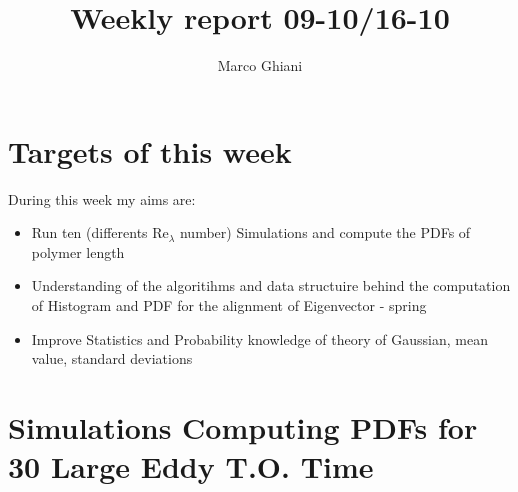 \documentclass[]{article}
\title{Weekly report \textbf{09-10/16-10}}
\author{Marco Ghiani}
\begin{document}
\maketitle


\section{Targets of this week}
During this week my aims are: 
\begin{itemize}
   
   \item Run ten (differents Re$_\lambda$ number) Simulations and compute the PDFs of polymer length  
   \item Understanding of the algoritihms and data structuire  behind the computation of Histogram and PDF for the alignment of Eigenvector - spring    
   \item Improve Statistics and Probability knowledge of theory of Gaussian, mean value, standard deviations
\end{itemize}

\section {Simulations Computing PDFs for 30 Large Eddy T.O. Time}


%
%
\end{document}
